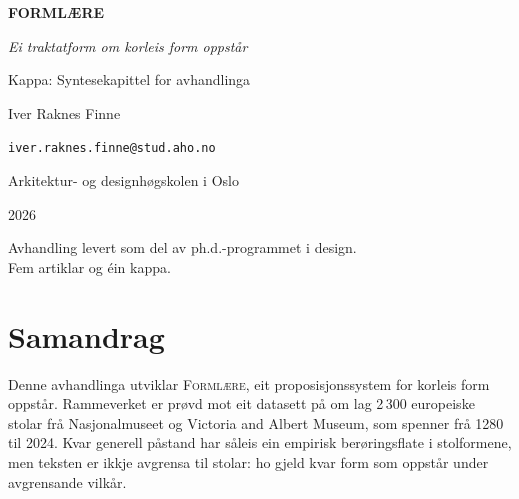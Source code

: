 \documentclass[12pt,a4paper,oneside]{report}
\begin{document}
\begin{titlepage}
\centering
\vspace*{2cm}

{\Huge\bfseries FORMLÆRE\par}
\vspace{0.5cm}
{\Large\itshape Ei traktatform om korleis form oppstår\par}
\vspace{1.5cm}

{\large Kappa: Syntesekapittel for avhandlinga\par}
\vspace{2cm}

{\Large Iver Raknes Finne\par}
\vspace{0.5cm}
{\large\texttt{iver.raknes.finne@stud.aho.no}\par}
\vspace{1cm}
{\large Arkitektur- og designhøgskolen i Oslo\par}
\vspace{0.5cm}
{\large 2026\par}

\vfill

{\small Avhandling levert som del av ph.d.-programmet i design.\\
Fem artiklar og éin kappa.}
\end{titlepage}

\chapter*{Samandrag}

Denne avhandlinga utviklar \textsc{Formlære}, eit proposisjonssystem for korleis form oppstår. Rammeverket er prøvd mot eit datasett på om lag 2\,300 europeiske stolar frå Nasjonalmuseet og Victoria and Albert Museum, som spenner frå 1280 til 2024. Kvar generell påstand har såleis ein empirisk berøringsflate i stolformene, men teksten er ikkje avgrensa til stolar: ho gjeld kvar form som oppstår under avgrensande vilkår.
\end{document}
